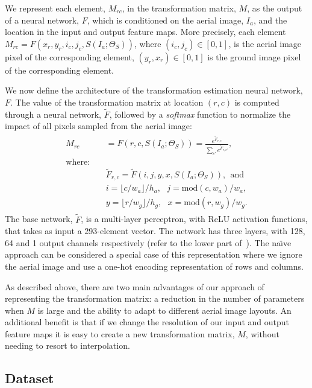 We represent each element, $M_{rc}$, in the transformation matrix,
$M$, as the output of a neural network, $F$, which is conditioned on
the aerial image, $I_a$, and the location in the input and output
feature maps. More precisely, each element $M_{rc} =
F(x_r,y_r,i_c,j_c,S(I_a;\Theta_S))$, where $(i_c, j_c) \in [0,1]$, is
the aerial image pixel of the corresponding element, $(y_r, x_r)
\in [0,1]$ is the ground image pixel of the corresponding
element.

We now define the architecture of the transformation estimation neural
network, $F$. The value of the transformation matrix at
location $(r, c)$ is computed through a neural network, $\tilde{F}$,
followed by a {\em softmax} function to normalize the impact of all
pixels sampled from the aerial image:
\begin{align*}
\begin{split}
  M_{rc} &= F\left(r, c, S(I_a; \Theta_S)\right)
  = \frac{e^{\tilde{F}_{r,c}}}{\sum_{c'}{e^{\tilde{F}_{r,c'}}}}, \\
\textrm{where:} ~~~~~&\\
  &\tilde{F}_{r, c} = \tilde{F}\left(i, j, y, x, S(I_a; \Theta_S)\right), 
  ~~\textrm{and}\\
  & i = \lfloor c / w_a \rfloor / h_a, ~~~j = \mathrm{mod}(c,w_a) / w_a, \\
  & y = \lfloor r / w_g \rfloor / h_g, ~~~x = \mathrm{mod}(r,w_g) / w_g.
\label{equ:matmul}
\end{split}
\end{align*}
The base network, $\tilde{F}$, is a multi-layer perceptron, with ReLU
activation functions, that takes as input a 293-element vector.
The network has three layers, with 128, 64 and 1 output channels
respectively (refer to the lower part of~).  The
na\"{\i}ve approach can be considered a special case of this
representation where we ignore the aerial image and use a one-hot
encoding representation of rows and columns.  

As described above, there are two main advantages of our approach of
representing the transformation matrix: a reduction in the number of
parameters when $M$ is large and the ability to adapt to different
aerial image layouts.  An additional benefit is that if we change the
resolution of our input and output feature maps it is easy to create a
new transformation matrix, $M$, without needing to resort to
interpolation.

\subsection{Dataset}
\label{sec:dataset_cross}

